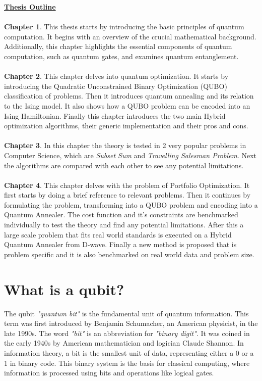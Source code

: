 \documentclass[12pt,a4paper]{report}
\begin{document}
\noindent
{\Large \textbf{\underline{Thesis Outline}}}
\\~\\

\noindent
\textbf{Chapter 1}. This thesis starts by introducing the basic principles of quantum computation. It begins with an overview of the crucial mathematical background. Additionally, this chapter highlights the essential components of quantum computation, such as quantum gates, and examines quantum entanglement.
\\
\\
\noindent
\textbf{Chapter 2}. This chapter delves into quantum optimization. It starts by introducing the Quadratic Unconstrained Binary Optimization (QUBO) classification of problems. Then it introduces quantum annealing and its relation to the Ising model. It also shows how a QUBO problem can be encoded into an Ising Hamiltonian. Finally this chapter introduces the two main Hybrid optimization algorithms, their generic implementation and their pros and cons.
\\
\\
\noindent
\textbf{Chapter 3}. In this chapter the theory is tested in 2 very popular problems in Computer Science, which are \textit{Subset Sum} and \textit{Travelling Salesman Problem}. Next the algorithms are compared with each other to see any potential limitations.
\\
\\
\noindent
\textbf{Chapter 4}. This chapter delves with the problem of Portfolio Optimization. It first starts by doing a brief reference to relevant problems. Then it continues by formulating the problem, transforming into a QUBO problem and encoding into a Quantum Annealer. The cost function and it's constraints are benchmarked individually to test the theory and find any potential limitations. After this a large scale problem that fits real world standards is executed on a Hybrid Quantum Annealer from D-wave. Finally a new method is proposed that is problem specific and it is also benchmarked on real world data and problem size.
\newpage

\section{What is a qubit?}
The qubit \textit{"quantum bit"} is the fundamental unit of quantum information. This term was first introduced by Benjamin Schumacher, an American physicist, in the late 1990s. The word \textit{"bit"} is an abbreviation for \textit{"binary digit"}. It was coined in the early 1940s by American mathematician and logician Claude Shannon. In information theory, a bit is the smallest unit of data, representing either a 0 or a 1 in binary code. This binary system is the basis for classical computing, where information is processed using bits and operations like logical gates.
\end{document}
